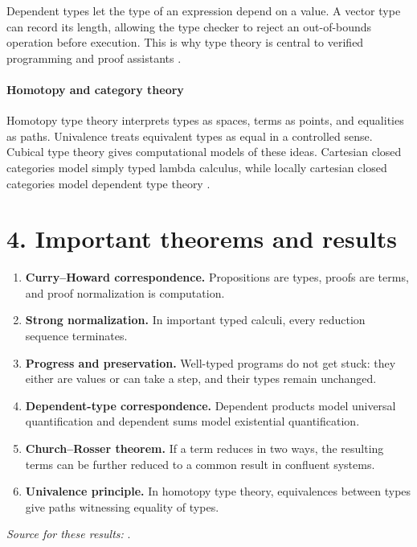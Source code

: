 Dependent types let the type of an expression depend on a value. A vector type can record its length, allowing the type checker to reject an out-of-bounds operation before execution. This is why type theory is central to verified programming and proof assistants \cite{type_ref3}.

\paragraph{Homotopy and category theory}
Homotopy type theory interprets types as spaces, terms as points, and equalities as paths. Univalence treats equivalent types as equal in a controlled sense. Cubical type theory gives computational models of these ideas. Cartesian closed categories model simply typed lambda calculus, while locally cartesian closed categories model dependent type theory \cite{type_ref4}.

\section*{4. Important theorems and results}
\begin{enumerate}[leftmargin=*,itemsep=0.35em]
\item \textbf{Curry--Howard correspondence.} Propositions are types, proofs are terms, and proof normalization is computation.

\item \textbf{Strong normalization.} In important typed calculi, every reduction sequence terminates.

\item \textbf{Progress and preservation.} Well-typed programs do not get stuck: they either are values or can take a step, and their types remain unchanged.

\item \textbf{Dependent-type correspondence.} Dependent products model universal quantification and dependent sums model existential quantification.

\item \textbf{Church--Rosser theorem.} If a term reduces in two ways, the resulting terms can be further reduced to a common result in confluent systems.

\item \textbf{Univalence principle.} In homotopy type theory, equivalences between types give paths witnessing equality of types.
\end{enumerate}
\noindent\emph{Source for these results:} \cite{type_ref1}.


